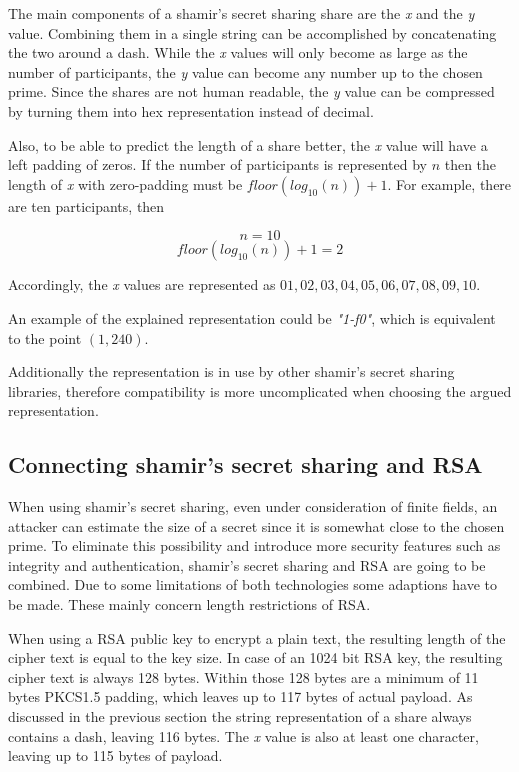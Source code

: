 The main components of a shamir's secret sharing share are the \textit{x} and
the \textit{y} value. Combining them in a single string can be accomplished by
concatenating the two around a dash. While the \textit{x} values will only
become as large as the number of participants, the \textit{y} value can become
any number up to the chosen prime. Since the shares are not human readable,
the \textit{y} value can be compressed by turning them into hex representation
instead of decimal.

Also, to be able to predict the length of a share better, the \textit{x} value
will have a left padding of zeros. If the number of participants is represented
by $n$ then the length of \textit{x} with zero-padding must be
$floor(log_{10}(n))+1$. For example, there are ten participants, then

$$n = 10$$
$$floor(log_{10}(n))+1 = 2$$

Accordingly, the \textit{x} values are represented as $01, 02, 03, 04, 05, 06,
07, 08, 09, 10$.

An example of the explained representation could be \textit{"1-f0"}, which is
equivalent to the point $(1, 240)$.

Additionally the representation is in use by other shamir's secret sharing
libraries, therefore compatibility is more uncomplicated when choosing the
argued representation.

\subsection{Connecting shamir's secret sharing and RSA}

When using shamir's secret sharing, even under consideration of finite fields,
an attacker can estimate the size of a secret since it is somewhat close to the
chosen prime. To eliminate this possibility and introduce more security
features such as integrity and authentication, shamir's secret sharing and RSA
are going to be combined. Due to some limitations of both technologies some
adaptions have to be made. These mainly concern length restrictions of RSA.

When using a RSA public key to encrypt a plain text, the resulting length of
the cipher text is equal to the key size. In case of an 1024 bit RSA key, the
resulting cipher text is always 128 bytes. Within those 128 bytes are a minimum
of 11 bytes PKCS1.5 padding, which leaves up to 117 bytes of actual payload. As
discussed in the previous section the string representation of a share always
contains a dash, leaving 116 bytes. The \textit{x} value is also at least one
character, leaving up to 115 bytes of payload.

